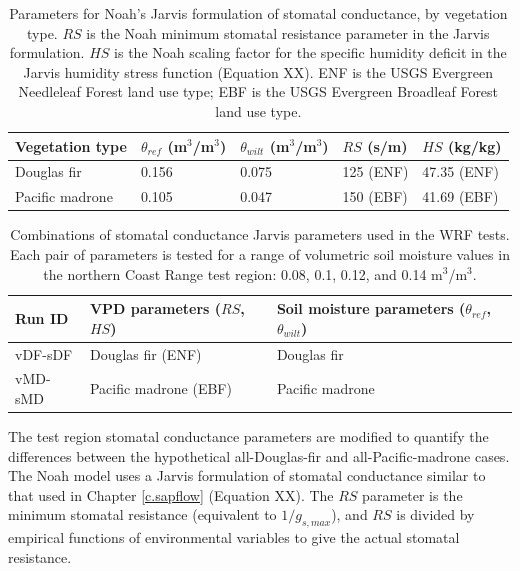 \begin{table}
\begin{tabular}{ l p{3cm} p{3cm} p{2cm} p{3cm} }
\hline
Vegetation type & $\theta_{ref}$ (m$^3$/m$^3$) & $\theta_{wilt}$ (m$^3$/m$^3$) & $RS$ (s/m) & $HS$ (kg/kg)\\ \hline
Douglas fir & 0.156 & 0.075 & 125 (ENF) & 47.35 (ENF)\\
Pacific madrone & 0.105 & 0.047 & 150 (EBF) & 41.69 (EBF)\\
\hline
\end{tabular}
\caption{Parameters for Noah's Jarvis formulation of stomatal conductance, by vegetation type.  $RS$ is the Noah minimum stomatal resistance parameter in the Jarvis formulation. $HS$ is the Noah scaling factor for the specific humidity deficit in the Jarvis humidity stress function (Equation XX).  ENF is the USGS Evergreen Needleleaf Forest land use type; EBF is the USGS Evergreen Broadleaf Forest land use type.}
\label{table:BL_NoahJarvisparams}
\end{table}

\begin{table}
\begin{tabular}{ l p{6cm} p{7cm} }
\hline
Run ID & VPD parameters ($RS$, $HS$) & Soil moisture parameters ($\theta_{ref}$, $\theta_{wilt}$)\\ \hline
vDF-sDF & Douglas fir (ENF) & Douglas fir\\
vMD-sMD & Pacific madrone (EBF) & Pacific madrone\\
\hline
\end{tabular}
\caption{Combinations of stomatal conductance Jarvis parameters used in the WRF tests.  Each pair of parameters is tested for a range of volumetric soil moisture values in the northern Coast Range test region: 0.08, 0.1, 0.12, and 0.14 m$^3$/m$^3$.}
\label{table:BL_WRFruns}
\end{table}

The test region stomatal conductance parameters are modified to quantify the differences between the hypothetical all-Douglas-fir and all-Pacific-madrone cases.  The Noah model uses a Jarvis formulation of stomatal conductance similar to that used in Chapter \ref{c.sapflow} (Equation XX).  The $RS$ parameter is the minimum stomatal resistance (equivalent to $1/g_{s,max}$), and $RS$ is divided by empirical functions of environmental variables to give the actual stomatal resistance.  

